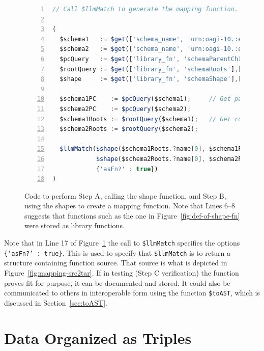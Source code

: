\documentclass[10pt,letterpaper]{article} %
\newcommand{\stt}[1]{\texttt{#1}} %
\begin{document}
\begin{figure}[H]
  \caption{Code to perform Step A, calling the shape function, and Step B, using the shapes to create a mapping function.
  Note that Lines 6--8 suggests that functions such as the one in Figure~\ref{fig:def-of-shape-fn} were stored as library functions.}
  \label{fig:call-to-shape}
\begin{lstlisting}[language=JavaScript,numberstyle=\scriptsize,basicstyle=\ttfamily\scriptsize,numbers=left,stepnumber=1,breaklines=true]
// Call $llmMatch to generate the mapping function. Note use of {'asFn?' true} in the call.

(
  $schema1   := $get(['schema_name', 'urn:oagi-10.:elena.2023-07-02.ProcessInvoice-BC_1_v2'], ['schema_content']);
  $schema2   := $get(['schema_name', 'urn:oagi-10.:elena.2023-07-02.ProcessInvoice-BC_2_v2'], ['schema_content']);
  $pcQuery   := $get(['library_fn', 'schemaParentChild'],['fn_exe']).fn_exe;
  $rootQuery := $get(['library_fn', 'schemaRoots'],['fn_exe']).fn_exe;
  $shape     := $get(['library_fn', 'schemaShape'],['fn_exe']).fn_exe;

  $schema1PC    := $pcQuery($schema1);     // Get parent-child relationships of each schema.
  $schema2PC    := $pcQuery($schema2);
  $schema1Roots := $rootQuery($schema1);   // Get root elements of each schema.
  $schema2Roots := $rootQuery($schema2);

  $llmMatch($shape($schema1Roots.?name[0], $schema1PC), // [0] is cheating a bit; there could be multiple roots.
            $shape($schema2Roots.?name[0], $schema2PC), // Call $llmMatch to do shape matching
            {'asFn?' : true})
)
\end{lstlisting}
\end{figure} \vspace{-3em}

Note that in Line 17 of Figure~\ref{fig:call-to-shape} the call to \stt{\$llmMatch} specifies the options \stt{\{'asFn?' : true\}}. This is used to specify that \stt{\$llmMatch} is to return a structure containing function source.
That source is what is depicted in Figure~\ref{fig:mapping-src2tar}.
If in testing (Step C verification) the function proves fit for purpose, it can be documented and stored.
It could also be communicated to others in interoperable form using the function \stt{\$toAST}, which is discussed in Section~\ref{sec:toAST}.

\section{Data Organized as Triples}
 \label{sec:query}
\end{document}
